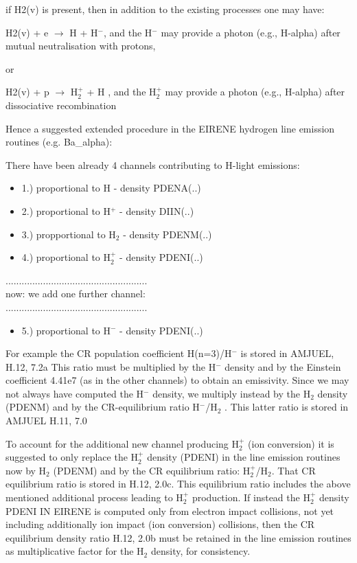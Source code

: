 \documentclass[12pt,dvipdfmx]{article}
\begin{document}
\begin{itemize}
if H2(v) is present, then in addition to the existing processes
one may have:

H2(v) + e $\rightarrow$ H + H$^-$, and the H$^-$ may provide a photon (e.g., H-alpha)
after mutual neutralisation
with protons,

or

H2(v) + p $\rightarrow$ H$_2^+$  + H , and the H$_2^+$ may provide a photon (e.g., H-alpha)
after dissociative recombination



Hence a suggested extended procedure in the EIRENE hydrogen line emission routines
(e.g. Ba\_alpha):

There have been already 4 channels contributing to H-light emissions:
\begin{itemize}
\item
1.) proportional to H - density PDENA(..)
\item
2.) proportional to H$^+$ - density DIIN(..)
\item
3.) propportional to H$_2$ - density PDENM(..)
\item
4.) proportional to H$_2^+$ - density PDENI(..)
\end{itemize}
.....................................................\\
now: we add one further channel:\\
.....................................................\\
\begin{itemize}
\item
5.) proportional to H$^-$ - density PDENI(..)
\end{itemize}
For example the CR population coefficient H(n=3)/H$^-$ is stored in AMJUEL, H.12, 7.2a
This ratio must be multiplied by the H$^-$ density and by the Einstein coefficient 4.41e7
(as in the other channels) to obtain an emissivity.
Since we may not always have computed the H$^-$ density, we multiply instead by the H$_2$ density
(PDENM) and by the CR-equilibrium ratio H$^-$/H$_2$ . This latter ratio is stored in AMJUEL H.11, 7.0

To account for the additional new channel producing H$_2^+$ (ion conversion)
it is suggested to only replace the
H$_2^+$ density (PDENI) in the line emission routines now by H$_2$ (PDENM) and by the
CR equilibrium ratio: H$_2^+$/H$_2$.
That CR equilibrium ratio is stored in H.12, 2.0c.
This equilibrium ratio includes the above mentioned additional
process leading to H$_2^+$ production.
If instead the H$_2^+$ density PDENI IN EIRENE
is computed only from electron impact collisions, not
yet including additionally ion impact (ion conversion) collisions, then the CR equilibrium density ratio H.12, 2.0b
must be retained in the line emission routines as multiplicative factor for the H$_2$ density, for consistency.


\end{itemize}
\end{document}
